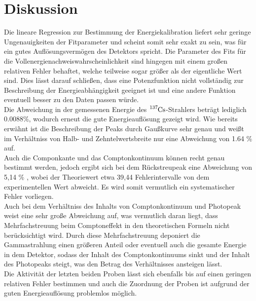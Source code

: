 \section{Diskussion}
Die lineare Regression zur Bestimmung der Energiekalibration liefert sehr geringe Ungenauigkeiten
der Fitparameter und scheint somit sehr exakt zu sein, was für ein gutes Auflösungsvermögen
des Detektors spricht. Die Parameter des Fits für die Vollenergienachweiswahrscheinlichkeit sind hingegen
mit einem großen relativen Fehler behaftet, welche teilweise sogar größer als der
eigentliche Wert sind. Dies lässt darauf schließen, dass eine Potenzfunktion
nicht vollständig zur Beschreibung der Energieabhängigkeit geeignet ist und
eine andere Funktion eventuell besser zu den Daten passen würde. \\
Die Abweichung in der gemessenen Energie des $\ce{^{137}Cs}$-Strahlers beträgt lediglich
0.0088\%, wodurch erneut die gute Energieauflösung gezeigt wird. Wie bereits erwähnt
ist die Beschreibung der Peaks durch Gaußkurve sehr genau und weißt im Verhältniss
von Halb- und Zehntelwertsbreite nur eine Abweichung von 1.64 \% auf. \\
Auch die Componkante und das Comptonkontinuum können recht genau bestimmt werden,
jedoch ergibt sich bei dem Rückstreupeak eine Abweichung von 5,14 \% , wobei der Theoriewert etwa 39,44
Fehlerintervalle von dem experimentellen Wert abweicht. Es wird somit vermutlich ein systematischer Fehler
vorliegen. \\
Auch bei dem Verhältniss des Inhalts von Comptonkontinuum und Photopeak weist eine
sehr große Abweichung auf, was vermutlich daran liegt, dass Mehrfachstreuung beim
Comptoneffekt in den theoretischen Formeln nicht berücksichtigt wird. Durch diese
Mehrfachstreuung deponiert die Gammastrahlung einen größeren Anteil oder eventuell auch die
gesamte Energie in dem Detektor, sodass der Inhalt des Comptonkontinuums sinkt und der
Inhalt des Photopeaks steigt, was den Betrag des Verhältnisses ansteigen lässt. \\
Die Aktivität der letzten beiden Proben lässt sich ebenfalls bis auf einen geringen
relativen Fehler bestimmen und auch die Zuordnung der Proben ist aufgrund der
guten Energieauflösung problemlos möglich.
